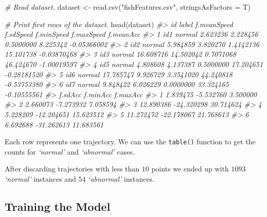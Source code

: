 \documentclass[
  11pt,
]{krantz}
\newenvironment{Shaded}{\begin{snugshade}}{\end{snugshade}}
\newcommand{\AttributeTok}[1]{\textcolor[rgb]{0.61,0.61,0.61}{#1}}
\newcommand{\CommentTok}[1]{\textcolor[rgb]{0.37,0.37,0.37}{\textit{#1}}}
\newcommand{\FunctionTok}[1]{\textcolor[rgb]{0,0,0}{#1}}
\newcommand{\NormalTok}[1]{#1}
\newcommand{\OtherTok}[1]{\textcolor[rgb]{0.37,0.37,0.37}{#1}}
\newcommand{\SpecialCharTok}[1]{\textcolor[rgb]{0,0,0}{#1}}
\newcommand{\StringTok}[1]{\textcolor[rgb]{0.5,0.5,0.5}{#1}}
\begin{document}
\begin{Shaded}
\begin{Highlighting}[]
\CommentTok{\# Read dataset.}
\NormalTok{dataset }\OtherTok{\textless{}{-}} \FunctionTok{read.csv}\NormalTok{(}\StringTok{"fishFeatures.csv"}\NormalTok{, }\AttributeTok{stringsAsFactors =}\NormalTok{ T)}

\CommentTok{\# Print first rows of the dataset.}
\FunctionTok{head}\NormalTok{(dataset)}
\CommentTok{\#\textgreater{}    id  label f.meanSpeed f.sdSpeed f.minSpeed f.maxSpeed   f.meanAcc}
\CommentTok{\#\textgreater{} 1 id1 normal    2.623236  2.228456  0.5000000   8.225342 {-}0.05366002}
\CommentTok{\#\textgreater{} 2 id2 normal    5.984859  3.820270  1.4142136  15.101738 {-}0.03870468}
\CommentTok{\#\textgreater{} 3 id3 normal   16.608716 14.502042  0.7071068  46.424670 {-}1.00019597}
\CommentTok{\#\textgreater{} 4 id5 normal    4.808608  4.137387  0.5000000  17.204651 {-}0.28181520}
\CommentTok{\#\textgreater{} 5 id6 normal   17.785747  9.926729  3.3541020  44.240818 {-}0.53753380}
\CommentTok{\#\textgreater{} 6 id7 normal    9.848422  6.026229  0.0000000  33.324165 {-}0.10555561}
\CommentTok{\#\textgreater{} f.sdAcc   f.minAcc  f.maxAcc}
\CommentTok{\#\textgreater{} 1  1.839475  {-}5.532760  3.500000}
\CommentTok{\#\textgreater{} 2  2.660073  {-}7.273932  7.058594}
\CommentTok{\#\textgreater{} 3 12.890386 {-}24.320298 30.714624}
\CommentTok{\#\textgreater{} 4  5.228209 {-}12.204651 15.623512}
\CommentTok{\#\textgreater{} 5 11.272472 {-}22.178067 21.768613}
\CommentTok{\#\textgreater{} 6  6.692688 {-}31.262613 11.683561}
\end{Highlighting}
\end{Shaded}

Each row represents one trajectory. We can use the \texttt{table()} function to get the counts for \emph{`normal'} and \emph{`abnormal'} cases.

\begin{Shaded}
\end{Shaded}

After discarding trajectories with less than \(10\) points we ended up with \(1093\) \emph{`normal'} instances and \(54\) \emph{`abnormal'} instances.

\hypertarget{training-the-model}{%
\subsection{Training the Model}\label{training-the-model}}
\end{document}
